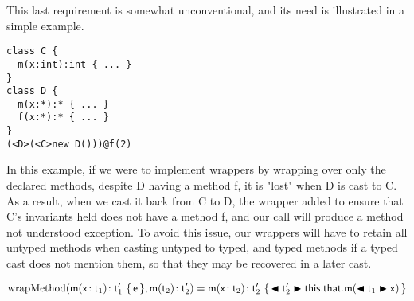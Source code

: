 \documentclass[a4paper,UKenglish,final]{lipics}
\begin{document}
This last requirement is somewhat unconventional, and its need is illustrated in a simple example. 

\begin{verbatim}
class C {
  m(x:int):int { ... }
}
class D {
  m(x:*):* { ... }
  f(x:*):* { ... }
}
(<D>(<C>new D()))@f(2)
\end{verbatim}

In this example, if we were to implement wrappers by wrapping over only the declared methods, despite D having a method f, it is "lost" when D is cast to C. As a result, when we cast it back from C to D, the wrapper added to ensure that C's invariants held does not have a method f, and our call will produce a method not understood exception. To avoid this issue, our wrappers will have to retain all untyped methods when casting untyped to typed, and typed methods if a typed cast does not mention them, so that they may be recovered in a later cast.

\hrulefill
\newcommand{\wm}{\text{wrapMethod}}
\begin{align*}
\wm{(\Mdef\m\x{\t_1}{\tp_1}\e,\Mtype\m{\t_2}{\tp_2})} = \Mdef\m\x{\t_2}{\tp_2}{\BehCast{\tp_2}{\Call{\this.\xt{that}}{\m}{\BehCast{\t_1}{\x}}}}\\
\end{align*}
\end{document}
